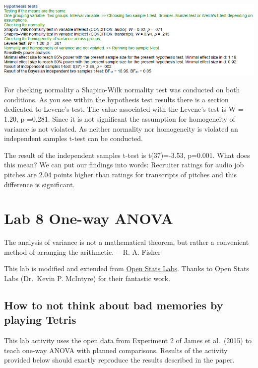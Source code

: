 \documentclass[
]{book}
\begin{document}
\includegraphics{img/ch7/7.3comparegroups_hyptest.png}

For checking normality a Shapiro-Wilk normality test was conducted on both conditions. As you see within the hypothesis test results there is a section dedicated to Levene's test. The value associated with the Levene's test is W = 1.20, p =0.281. Since it is not significant the assumption for homogeneity of variance is not violated. As neither normality nor homogeneity is violated an independent samples t-test can be conducted.

The result of the independent samples t-test is t(37)=-3.53, p=0.001. What does this mean? We can put our findings into words: Recruiter ratings for audio job pitches are 2.04 points higher than ratings for transcripts of pitches and this difference is significant.

\hypertarget{lab-8-one-way-anova}{%
\chapter{Lab 8 One-way ANOVA}\label{lab-8-one-way-anova}}

{
The analysis of variance is not a mathematical theorem, but rather a convenient method of arranging the arithmetic.
---R. A. Fisher
}

This lab is modified and extended from \href{https://sites.trinity.edu/osl}{Open Stats Labs}. Thanks to Open Stats Labs (Dr.~Kevin P. McIntyre) for their fantastic work.

\hypertarget{how-to-not-think-about-bad-memories-by-playing-tetris}{%
\section{How to not think about bad memories by playing Tetris}\label{how-to-not-think-about-bad-memories-by-playing-tetris}}

This lab activity uses the open data from Experiment 2 of James et al.~(2015) to teach one-way ANOVA with planned comparisons. Results of the activity provided below should exactly reproduce the results described in the paper.
\end{document}
